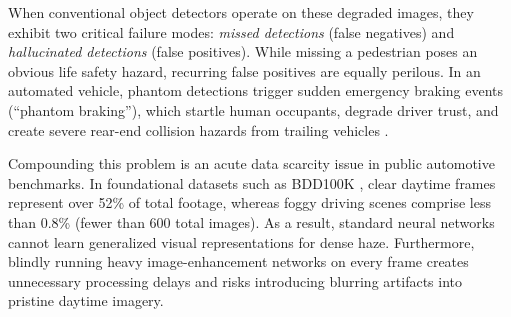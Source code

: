 \documentclass[conference]{IEEEtran}
\begin{document}
When conventional object detectors operate on these degraded images, they exhibit two critical failure modes: \textit{missed detections} (false negatives) and \textit{hallucinated detections} (false positives). While missing a pedestrian poses an obvious life safety hazard, recurring false positives are equally perilous. In an automated vehicle, phantom detections trigger sudden emergency braking events (``phantom braking''), which startle human occupants, degrade driver trust, and create severe rear-end collision hazards from trailing vehicles \cite{gupta2024robust}.

Compounding this problem is an acute data scarcity issue in public automotive benchmarks. In foundational datasets such as BDD100K \cite{yu2020bdd100k}, clear daytime frames represent over 52\% of total footage, whereas foggy driving scenes comprise less than 0.8\% (fewer than 600 total images). As a result, standard neural networks cannot learn generalized visual representations for dense haze. Furthermore, blindly running heavy image-enhancement networks on every frame creates unnecessary processing delays and risks introducing blurring artifacts into pristine daytime imagery. 
\end{document}
